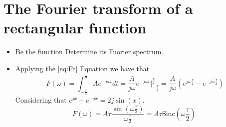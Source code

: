 \section{The Fourier transform of a rectangular function}
\label{sec:funcion_muestreo}
\begin{itemize}
\item [] Be the function
  Determine its Fuorier spectrum.

\item[] Applying the \ref{eq:Ft} Equation we have that
  \begin{equation*}
    F(\omega) = \displaystyle\int_{-\frac{\tau}{2}}^{\frac{\tau}{2}}
    Ae^{-j\omega t}dt = \displaystyle\frac{A}{j\omega}e^{-j\omega
      t}\displaystyle|_{-\frac{\tau}{2}}^{\frac{\tau}{2}} =
    \displaystyle\frac{A}{j\omega}(e^{j\omega\frac{\tau}{2}}-e^{-j\omega\frac{\tau}{2}})
  \end{equation*}
  Considering that $e^{jx}-e^{-jx}=2j\sin(x)$.
  \begin{equation*}
   F(\omega)=
   A\tau\displaystyle\frac{\sin(\omega\frac{\tau}{2})}{\omega\frac{\tau}{2}}
   = A\tau\mathrm{Sinc}(\omega\frac{\tau}{2}).
  \end{equation*}
  

\end{itemize}

